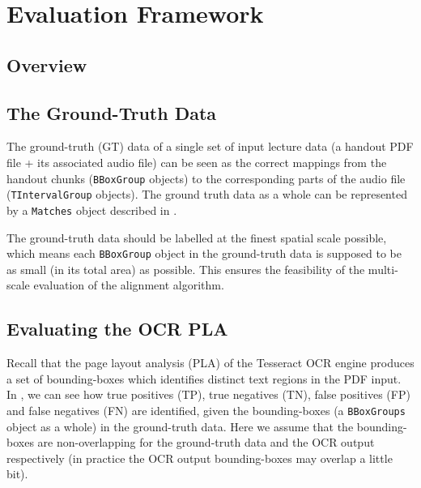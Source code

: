 
\chapter{Evaluation Framework}
\label{chap:eval-framework}

\ifpdf
    \graphicspath{{Chapter7/Figs/Raster/}{Chapter7/Figs/PDF/}{Chapter7/Figs/}}
\else
    \graphicspath{{Chapter7/Figs/Vector/}{Chapter7/Figs/}}
\fi


\section{Overview}

\section{The Ground-Truth Data}

The ground-truth (GT) data of a single set of input lecture data (a handout PDF file + its associated audio file) can be seen as the correct mappings from the handout chunks (\texttt{BBoxGroup} objects) to the corresponding parts of the audio file (\texttt{TIntervalGroup} objects). The ground truth data as a whole can be represented by a \texttt{Matches} object described in .

The ground-truth data should be labelled at the finest spatial scale possible, which means each \texttt{BBoxGroup} object in the ground-truth data is supposed to be as small (in its total area) as possible. This ensures the feasibility of the multi-scale evaluation of the alignment algorithm.

\section{Evaluating the OCR PLA}

Recall that the page layout analysis (PLA) of the Tesseract OCR engine produces a set of bounding-boxes which identifies distinct text regions in the PDF input. In , we can see how true positives (TP), true negatives (TN), false positives (FP) and false negatives (FN) are identified, given the bounding-boxes (a \texttt{BBoxGroups} object as a whole) in the ground-truth data. Here we assume that the bounding-boxes are non-overlapping for the ground-truth data and the OCR output respectively (in practice the OCR output bounding-boxes may overlap a little bit).

